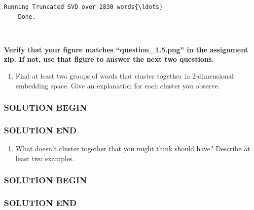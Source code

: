 \documentclass[11pt]{article}
\providecommand{\tightlist}{%
      \setlength{\itemsep}{0pt}\setlength{\parskip}{0pt}}
\begin{document}
\begin{Verbatim}[commandchars=\\\{\}]
    Running Truncated SVD over 2830 words{\ldots}
    Done.
\end{Verbatim}

\begin{center}
\end{center}
{ \hspace*{\fill} \\}

\textbf{Verify that your figure matches ``question\_1.5.png'' in the
    assignment zip. If not, use that figure to answer the next two
    questions.}

\begin{enumerate}
    \def\labelenumi{\alph{enumi}.}
    \tightlist
    \item
          Find at least two groups of words that cluster together in
          2-dimensional embedding space. Give an explanation for each cluster
          you observe.
\end{enumerate}

\subsubsection{SOLUTION BEGIN}\label{solution-begin}

\subsubsection{SOLUTION END}\label{solution-end}

\begin{enumerate}
    \def\labelenumi{\alph{enumi}.}
    \setcounter{enumi}{1}
    \tightlist
    \item
          What doesn't cluster together that you might think should have?
          Describe at least two examples.
\end{enumerate}

\subsubsection{SOLUTION BEGIN}\label{solution-begin}

\subsubsection{SOLUTION END}\label{solution-end}
\end{document}

